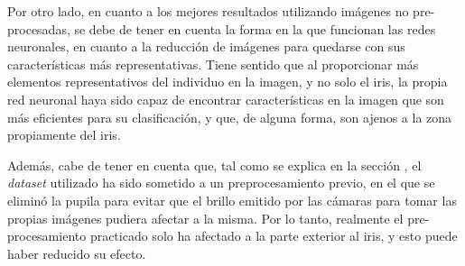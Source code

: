 Por otro lado, en cuanto a los mejores resultados utilizando imágenes no pre-procesadas, se debe de tener en cuenta la forma en la que funcionan las redes neuronales,
en cuanto a la reducción de imágenes para quedarse con sus características más representativas. Tiene sentido que al proporcionar más elementos representativos del individuo en la imagen,
y no solo el iris, la propia red neuronal haya sido capaz de encontrar características en la imagen que son más eficientes para su clasificación, y que, de alguna forma, son
ajenos a la zona propiamente del iris.

Además, cabe de tener en cuenta que, tal como se explica en la sección , el \textit{dataset} utilizado ha sido sometido a un preprocesamiento previo, en el que se eliminó la pupila 
para evitar que el brillo emitido por las cámaras para tomar las propias imágenes pudiera afectar a la misma. Por lo tanto, realmente el pre-procesamiento practicado solo ha afectado a la 
parte exterior al iris, y esto puede haber reducido su efecto.


